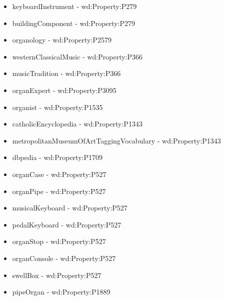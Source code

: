 \vspace{-0.15cm}
\begin{itemize}
    \itemsep0em 
    \item keyboardInstrument - wd:Property:P279
       \vspace{-0.025cm}
    \item buildingComponent - wd:Property:P279
       \vspace{-0.025cm}
    \item organology - wd:Property:P2579 
       \vspace{-0.025cm}
    \item westernClassicalMusic - wd:Property:P366
       \vspace{-0.025cm}
    \item musicTradition - wd:Property:P366
       \vspace{-0.025cm}
    \item organExpert - wd:Property:P3095
       \vspace{-0.025cm}
    \item organist - wd:Property:P1535
       \vspace{-0.025cm}
    \item catholicEncyclopedia - wd:Property:P1343
       \vspace{-0.025cm}
    \item metropolitanMuseumOfArtTaggingVocabulary - wd:Property:P1343
       \vspace{-0.025cm}
    \item dbpedia - wd:Property:P1709
       \vspace{-0.025cm}
    \item organCase - wd:Property:P527
       \vspace{-0.025cm}
    \item organPipe - wd:Property:P527
       \vspace{-0.025cm}
    \item musicalKeyboard - wd:Property:P527
       \vspace{-0.025cm}
    \item pedalKeyboard - wd:Property:P527
       \vspace{-0.025cm}
    \item organStop - wd:Property:P527
       \vspace{-0.025cm}
    \item organConsole - wd:Property:P527
       \vspace{-0.025cm}
    \item swellBox - wd:Property:P527
       \vspace{-0.025cm}
    \item pipeOrgan - wd:Property:P1889
\end{itemize}

